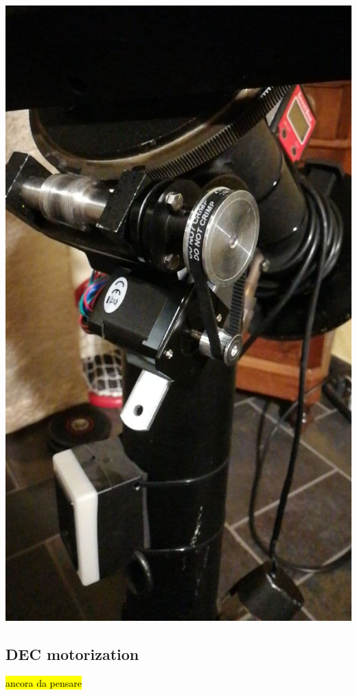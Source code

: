 \documentclass{article}
\begin{document}
\begin{multicols}{2}
\begin{minipage}{.5\textwidth}
            \includegraphics[scale=0.5]{images/RA_motorization.jpg}  
            \label{fig:RA_mechanization}         
        \end{minipage}

        \subsection{DEC motorization}
        \hl{ancora da pensare}


\end{multicols}
\end{document}
